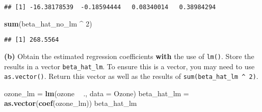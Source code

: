 \documentclass[
]{article}
\newenvironment{Shaded}{\begin{snugshade}}{\end{snugshade}}
\newcommand{\DataTypeTok}[1]{\textcolor[rgb]{0.13,0.29,0.53}{#1}}
\newcommand{\DecValTok}[1]{\textcolor[rgb]{0.00,0.00,0.81}{#1}}
\newcommand{\KeywordTok}[1]{\textcolor[rgb]{0.13,0.29,0.53}{\textbf{#1}}}
\newcommand{\NormalTok}[1]{#1}
\newcommand{\OperatorTok}[1]{\textcolor[rgb]{0.81,0.36,0.00}{\textbf{#1}}}
\newcommand{\StringTok}[1]{\textcolor[rgb]{0.31,0.60,0.02}{#1}}
\begin{document}
\begin{Shaded}
\end{Shaded}

\begin{verbatim}
## [1] -16.38178539  -0.18594444   0.08340014   0.38984294
\end{verbatim}

\begin{Shaded}
\begin{Highlighting}[]
\KeywordTok{sum}\NormalTok{(beta_hat_no_lm }\OperatorTok{^}\StringTok{ }\DecValTok{2}\NormalTok{)}
\end{Highlighting}
\end{Shaded}

\begin{verbatim}
## [1] 268.5564
\end{verbatim}

\textbf{(b)} Obtain the estimated regression coefficients \textbf{with}
the use of \texttt{lm()}. Store the results in a vector
\texttt{beta\_hat\_lm}. To ensure this is a vector, you may need to use
\texttt{as.vector()}. Return this vector as well as the results of
\texttt{sum(beta\_hat\_lm\ \^{}\ 2)}.

\begin{Shaded}
\begin{Highlighting}[]
\NormalTok{ozone_lm =}\StringTok{ }\KeywordTok{lm}\NormalTok{(ozone }\OperatorTok{~}\StringTok{ }\NormalTok{., }\DataTypeTok{data =}\NormalTok{ Ozone)}
\NormalTok{beta_hat_lm =}\StringTok{ }\KeywordTok{as.vector}\NormalTok{(}\KeywordTok{coef}\NormalTok{(ozone_lm))}
\NormalTok{beta_hat_lm}
\end{Highlighting}
\end{Shaded}
\end{document}
